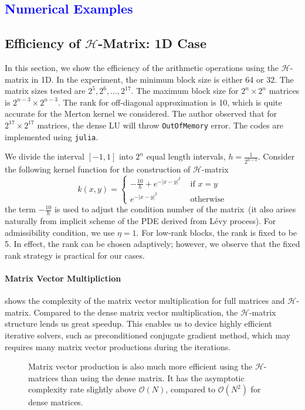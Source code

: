 \documentclass[10pt,a4paper]{article}
\newcommand{\lib}[1]{\textcolor{blue}{\section{#1}}}
\theoremstyle{definition}
\begin{document}
\lib{Numerical Examples}


\subsection{Efficiency of $\mathcal{H}$-Matrix: 1D Case}

In this section, we show the efficiency of the arithmetic operations using the $\mathcal{H}$-matrix in 1D. In the experiment, the minimum block size is either 64 or 32. The matrix sizes tested are $2^5, 2^6, \ldots, 2^{17}$. The maximum block size for $2^n\times 2^n$ matrices is $2^{n-3}\times 2^{n-3}$. The rank for off-diagonal approximation is 10, which is quite accurate for the Merton kernel we considered. The author observed that for $2^{17}\times 2^{17}$ matrices, the dense LU will throw \texttt{OutOfMemory} error. The codes are implemented using \texttt{julia}. 


We divide the interval $[-1,1]$ into $2^n$ equal length intervals, $h=\frac{1}{2^{n-1}}$. Consider the following kernel function for the construction of $\mathcal{H}$-matrix
\begin{equation}
	k(x,y) = \begin{cases}
		-\frac{10}{h} + e^{-|x-y|^2} & \mbox{ if } x=y\\
		e^{-|x-y|^2} & \mbox{ otherwise}
	\end{cases}
\end{equation}
the term $-\frac{10}{h}$ is used to adjust the condition number of the matrix~(it also arises naturally from implicit scheme of the PDE derived from L\'evy process). For admissibility condition,  we use $\eta=1$. For low-rank blocks, the rank is fixed to be 5. In effect, the rank can be chosen adaptively; however, we observe that the fixed rank strategy is practical for our cases. 

\paragraph{Matrix Vector Multipliction}

 shows the complexity of the matrix vector multiplication for full matrices and $\mathcal{H}$-matrix. Compared to the dense matrix vector multiplication, the $\mathcal{H}$-matrix structure lends us great speedup. This enables us to device highly efficient iterative solvers, such as preconditioned conjugate gradient method, which may requires many matrix vector productions during the iterations.  

\begin{figure}[htpb]
\centering
\scalebox{0.6}{}
\caption{Matrix vector production is also much more efficient using the $\mathcal{H}$-matrices than using the dense matrix. It has the asymptotic complexity rate slightly above $\mathcal{O}(N)$, compared to $\mathcal{O}(N^2)$ for dense matrices.}
\label{fig:matvec}
\end{figure}
\end{document}
